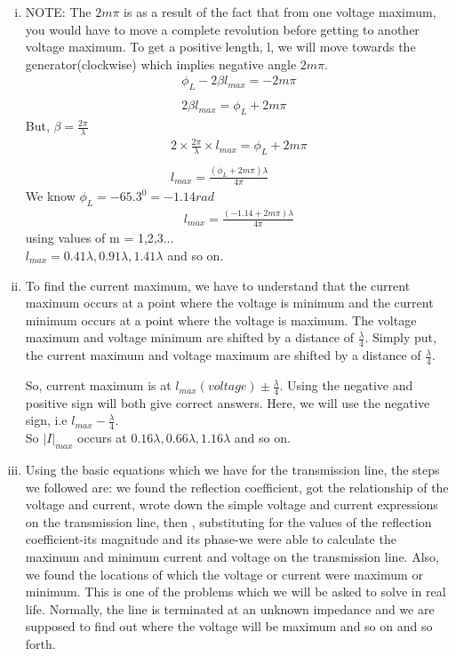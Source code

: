 \begin{example}
\begin{enumerate}[(i)]
\item NOTE: The $2m\pi$ is as a result of the fact that from one voltage maximum, you would have to move a complete revolution before getting to another voltage maximum. To get a positive length, l, we will move towards the generator(clockwise) which implies negative angle $2m\pi$.
\begin{align*}
\phi_{L}-2\beta l_{max}=-2m\pi\\\\
2\beta l_{max}= \phi_{L}+2m\pi
\end{align*}
But, $\beta = \frac{2\pi}{\lambda}$
\begin{align*}
2 \times \frac{2\pi}{\lambda}\times l_{max}= \phi_{L}+2m\pi\\\\
l_{max}=\frac{(\phi_L + 2m\pi)\lambda}{4\pi}
\end{align*}
We know $\phi_{L}=-65.3^{0}=-1.14rad$
\begin{align*}
l_{max}=\frac{(-1.14 + 2m\pi)\lambda}{4\pi}
\end{align*}
using values of m = 1,2,3...\\
$l_{max}=0.41\lambda , 0.91\lambda, 1.41\lambda$ and so on.

\item To find the current maximum, we have to understand that the current maximum occurs at a point where the voltage is minimum and the current minimum occurs at a point where the voltage is maximum. The voltage maximum and voltage minimum are shifted by a distance of $\frac{\lambda}{4}$. Simply put, the current maximum and voltage maximum are shifted by a distance of $\frac{\lambda}{4}$.

So, current maximum is at $l_{max}(voltage)\pm \frac{\lambda}{4}$. Using the negative and positive sign will both give correct answers. Here, we will use the negative sign, i.e $l_{max}-\frac{\lambda}{4}$.\\

So $|I|_{max}$ occurs at $0.16\lambda , 0.66\lambda , 1.16\lambda$ and so on.
\item Using the basic equations which we have for the transmission line, the steps we followed are: we found the reflection coefficient, got the relationship of the voltage and current, wrote down the simple voltage and current expressions on the transmission line, then , substituting for the values of the reflection coefficient-its magnitude and its phase-we were able to calculate the maximum and minimum current and voltage on the transmission line. Also, we found the locations of which the voltage or current were maximum or minimum. This is one of the problems which we will be asked to solve in real life. Normally, the line is terminated at an unknown impedance and we are supposed to find out where the voltage will be maximum and so on and so forth.
\end{enumerate}
\end{example}

